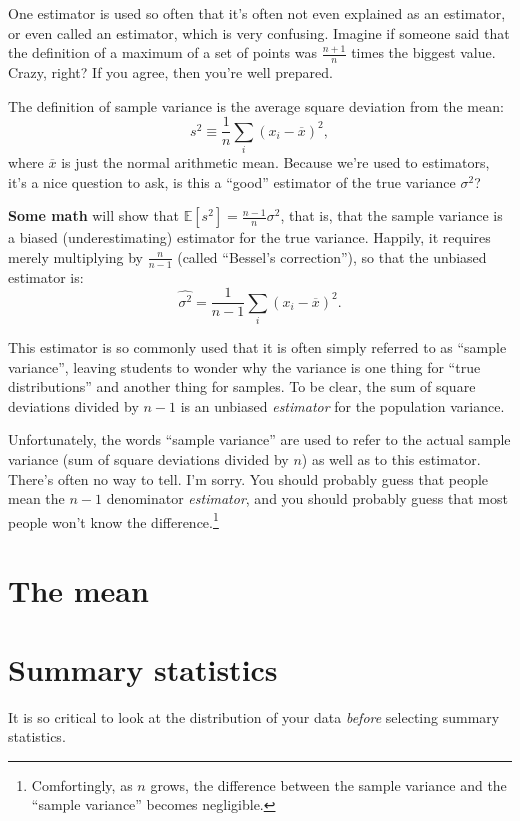 One estimator is used so often that it's often not even explained as an
estimator, or even called an estimator, which is very confusing. Imagine
if someone said that the definition of a maximum of a set of points was
\(\tfrac{n+1}{n}\) times the biggest value. Crazy, right? If you agree,
then you're well prepared.

The definition of sample variance is the average square deviation from
the mean: \[
s^2 \equiv \frac{1}{n} \sum_i (x_i - \overline{x})^2,
\] where \(\overline{x}\) is just the normal arithmetic mean. Because
we're used to estimators, it's a nice question to ask, is this a
``good'' estimator of the true variance \(\sigma^2\)?

\textbf{Some math} will show that
\(\mathbb{E}[s^2] = \tfrac{n-1}{n} \sigma^2\), that is, that the sample
variance is a biased (underestimating) estimator for the true variance.
Happily, it requires merely multiplying by \(\tfrac{n}{n-1}\) (called
``Bessel's correction''), so that the unbiased estimator is: \[
\hat{\sigma^2} = \frac{1}{n-1} \sum_i (x_i - \overline{x})^2.
\]

This estimator is so commonly used that it is often simply referred to
as ``sample variance'', leaving students to wonder why the variance is
one thing for ``true distributions'' and another thing for samples. To
be clear, the sum of square deviations divided by \(n-1\) is an unbiased
\emph{estimator} for the population variance.

Unfortunately, the words ``sample variance'' are used to refer to the
actual sample variance (sum of square deviations divided by \(n\)) as
well as to this estimator. There's often no way to tell. I'm sorry. You
should probably guess that people mean the \(n-1\) denominator
\emph{estimator}, and you should probably guess that most people won't
know the difference.\footnote{Comfortingly, as \(n\) grows, the
  difference between the sample variance and the ``sample variance''
  becomes negligible.}

\section{The mean}


\section{Summary statistics}\label{summary-statistics}

It is so critical to look
at the distribution of your data \emph{before} selecting summary
statistics.

